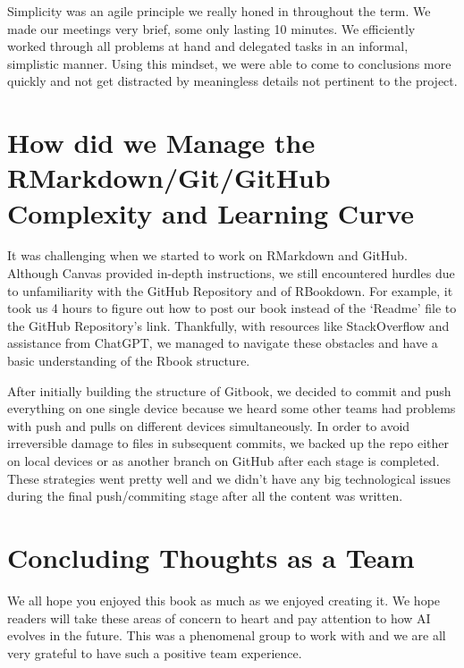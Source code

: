 \documentclass[
]{book}
\begin{document}
Simplicity was an agile principle we really honed in throughout the term. We made our meetings very brief, some only lasting 10 minutes. We efficiently worked through all problems at hand and delegated tasks in an informal, simplistic manner. Using this mindset, we were able to come to conclusions more quickly and not get distracted by meaningless details not pertinent to the project.

\hypertarget{how-did-we-manage-the-rmarkdowngitgithub-complexity-and-learning-curve}{%
\section{How did we Manage the RMarkdown/Git/GitHub Complexity and Learning Curve}\label{how-did-we-manage-the-rmarkdowngitgithub-complexity-and-learning-curve}}

It was challenging when we started to work on RMarkdown and GitHub. Although Canvas provided in-depth instructions, we still encountered hurdles due to unfamiliarity with the GitHub Repository and of RBookdown. For example, it took us 4 hours to figure out how to post our book instead of the `Readme' file to the GitHub Repository's link. Thankfully, with resources like StackOverflow and assistance from ChatGPT, we managed to navigate these obstacles and have a basic understanding of the Rbook structure.

After initially building the structure of Gitbook, we decided to commit and push everything on one single device because we heard some other teams had problems with push and pulls on different devices simultaneously. In order to avoid irreversible damage to files in subsequent commits, we backed up the repo either on local devices or as another branch on GitHub after each stage is completed. These strategies went pretty well and we didn't have any big technological issues during the final push/commiting stage after all the content was written.

\hypertarget{concluding-thoughts-as-a-team}{%
\section{Concluding Thoughts as a Team}\label{concluding-thoughts-as-a-team}}

We all hope you enjoyed this book as much as we enjoyed creating it. We hope readers will take these areas of concern to heart and pay attention to how AI evolves in the future. This was a phenomenal group to work with and we are all very grateful to have such a positive team experience.

  
\end{document}
